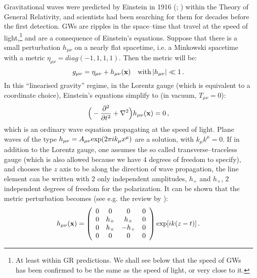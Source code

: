 Gravitational waves were predicted by Einstein in 1916 (\citealt{einstein1}; \citealt{einstein2}) within the Theory of General Relativity, and scientists had been searching for them for decades before the first detection. GWs are ripples in the space--time that travel at the speed of light,\footnote{At least within GR predictions. We shall see below that the speed of GWs has been confirmed to be the same as the speed of light, or very close to it.} and are a consequence of Einstein's equations. Suppose that there is a small perturbation $h_{\mu\nu}$ on a nearly flat spacetime, i.e. a Minkowski spacetime with a metric $\eta_{\mu\nu}=diag(-1,1,1,1)$. Then the metric will be:
\begin{equation}
g_{\mu\nu}=\eta_{\mu\nu}+h_{\mu\nu}({\bf x}) \quad {\rm with}\, |h_{\mu\nu}| \ll 1\,.
\end{equation}
In this ``linearised gravity'' regime, in the Lorentz gauge (which is equivalent to a coordinate choice), Einstein's equations simplify to (in vacuum, $T_{\mu\nu}=0$):
\begin{equation}
\Big( -\frac{\partial^2}{\partial t^2}+\nabla^2 \Big) h_{\mu\nu}({\bf x})=0\,,
\end{equation}
which is an ordinary wave equation propagating at the speed of light. Plane waves of the type $h_{\mu\nu}=A_{\mu\nu}{\rm exp} (2\pi i k_\mu x^\mu)$ are a solution, with $k_\mu k^{\mu}=0$. If in addition to the Lorentz gauge, one assumes the so called transverse--traceless gauge (which is also allowed because we have 4 degrees of freedom to specify), and chooses the $z$ axis to be along the direction of wave propagation, the line element can be written with 2 only independent amplitudes, $h_+$ and $h_\times$, 2 independent degrees of freedom for the polarization. It can be shown that the metric perturbation becomes (see e.g. the review by \citealt{riles}):
\[
h_{\mu\nu}({\bf x})=
  \left( \begin{array}{cccc}
   0 & 0 & 0 & 0\\
   0 & h_+ & h_\times & 0\\
   0 & h_\times & -h_+ & 0\\
   0 & 0 & 0 & 0\\
  \end{array}  \right) {\rm exp}[ik(z-t)]\, .
\]


